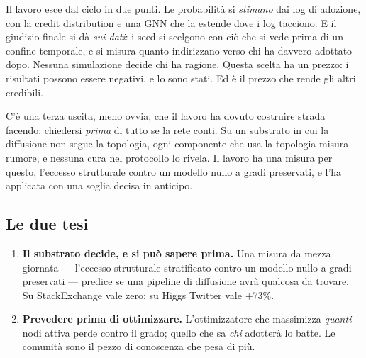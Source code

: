 \documentclass[11pt,a4paper]{article}
\newcommand{\sx}{StackExchange}
\newcommand{\hg}{Higgs Twitter}
\begin{document}
Il lavoro esce dal ciclo in due punti. Le probabilità si \emph{stimano} dai log di adozione, con la credit distribution e una GNN che la estende dove i log tacciono. E il giudizio finale si dà \emph{sui dati}: i seed si scelgono con ciò che si vede prima di un confine temporale, e si misura quanto indirizzano verso chi ha davvero adottato dopo. Nessuna simulazione decide chi ha ragione. Questa scelta ha un prezzo: i risultati possono essere negativi, e lo sono stati. Ed è il prezzo che rende gli altri credibili.

C'è una terza uscita, meno ovvia, che il lavoro ha dovuto costruire strada facendo: chiedersi \emph{prima} di tutto se la rete conti. Su un substrato in cui la diffusione non segue la topologia, ogni componente che usa la topologia misura rumore, e nessuna cura nel protocollo lo rivela. Il lavoro ha una misura per questo, l'eccesso strutturale contro un modello nullo a gradi preservati, e l'ha applicata con una soglia decisa in anticipo.

\subsection{Le due tesi}
\begin{enumerate}
  \item \textbf{Il substrato decide, e si può sapere prima.} Una misura da mezza giornata — l'eccesso strutturale stratificato contro un modello nullo a gradi preservati — predice se una pipeline di diffusione avrà qualcosa da trovare. Su \sx{} vale zero; su \hg{} vale $+73\%$.
  \item \textbf{Prevedere prima di ottimizzare.} L'ottimizzatore che massimizza \emph{quanti} nodi attiva perde contro il grado; quello che sa \emph{chi} adotterà lo batte. Le comunità sono il pezzo di conoscenza che pesa di più.
\end{enumerate}
\end{document}
